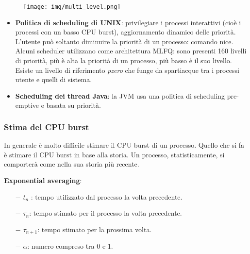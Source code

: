 \documentclass{article}
\begin{document}
 \begin{figure}[h!]
    \begin{center}
        \texttt{[image: img/multi\_level.png]}  
    \end{center}
\end{figure}

\begin{itemize}
    \item \textbf{Politica di scheduling di UNIX}: privilegiare
    i processi interattivi (cioè i processi con un basso CPU burst),
    aggiornamento dinamico delle priorità.    
    L'utente può soltanto diminuire la priorità di un processo: 
    comando nice. Alcuni scheduler utilizzano come architettura
    MLFQ: sono presenti 160 livelli di priorità,
    più è alta la priorità di un processo, più basso è il suo
    livello. Esiste un livello di riferimento \textit{pzero}
    che funge da spartiacque tra i processi utente e quelli
    di sistema.

    \item \textbf{Scheduling dei thread Java}: la JVM usa 
    una politica di scheduling pre-emptive e basata 
    su priorità.
    
    
\end{itemize}

\subsubsection{Stima del CPU burst}
In generale è molto difficile stimare il 
CPU burst di un processo. Quello che si fa è stimare il CPU 
burst in base alla storia. Un processo, statisticamente, si 
comporterà come nella sua storia più recente.

\noindent \textbf{Exponential averaging}:

\medskip
\noindent{}
\medskip

\noindent
\begin{itemize}
    \item[$-$] $t_n$ : tempo utilizzato dal processo la volta precedente.
    \item[$-$] $\tau_n$: tempo stimato per il processo la volta precedente.
    \item[$-$] $\tau_{n+1}$: tempo stimato per la prossima volta. 
    \item[$-$] $\alpha$: numero compreso tra 0 e 1.
\end{itemize}
\end{document}
